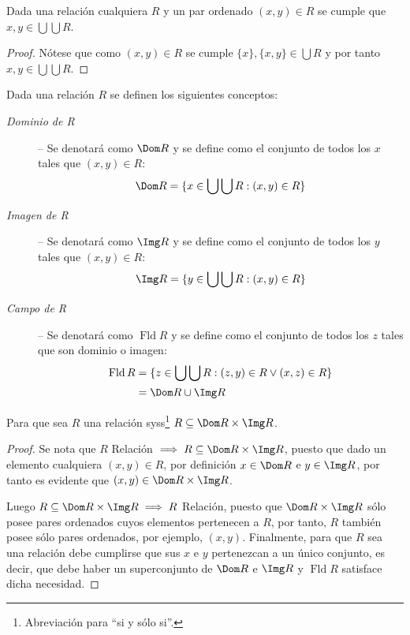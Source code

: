 \documentclass[11pt,oneside,a4paper]{book}
\DeclareMathOperator{\Fld}{Fld}
\begin{document}
\begin{lem}
Dada una relación cualquiera $R$ y un par ordenado $(x,y)\in R$ se cumple que $x,y\in \bigcup\bigcup R$.
\end{lem}
\begin{proof}
Nótese que como $(x,y)\in R$ se cumple $\{x\},\{x,y\}\in\bigcup R$ y por tanto $x,y\in\bigcup\bigcup R$.
\end{proof}
\begin{mydef}
Dada una relación $R$ se definen los siguientes conceptos:
\begin{description}
\item[\it Dominio de R] -- Se denotará como $\Dom R$ y se define como el conjunto de todos los $x$ tales que $(x,y)\in R$:
$$\Dom R=\{x\in\bigcup\bigcup R:(x,y)\in R\}$$
\item[\it Imagen de R] -- Se denotará como $\Img R$ y se define como el conjunto de todos los $y$ tales que $(x,y)\in R$:
$$\Img R=\{y\in\bigcup\bigcup R:(x,y)\in R\}$$
\item[\it Campo de R] -- Se denotará como $\Fld R$ y se define como el conjunto de todos los $z$ tales que son dominio o imagen:
\begin{align*}
\Fld R&=\{z\in\bigcup\bigcup R:(z,y)\in R\vee(x,z)\in R\}\\
&=\Dom R\cup\Img R
\end{align*}
\end{description}
\end{mydef}
\begin{prop}\label{prop:relation}
Para que sea $R$ una relación syss\footnote{Abreviación para ``si y sólo si''.} $R\subseteq\Dom R\times\Img R$.
\end{prop}
\begin{proof}
Se nota que $R$ Relación $\implies R\subseteq\Dom R\times\Img R$, puesto que dado un elemento cualquiera $(x,y)\in R$, por definición $x\in\Dom R$ e $y\in\Img R$, por tanto es evidente que $(x,y)\in\Dom R\times\Img R$.

Luego $R\subseteq\Dom R\times\Img R\implies R$ Relación, puesto que $\Dom R\times\Img R$ sólo posee pares ordenados cuyos elementos pertenecen a $R$, por tanto, $R$ también posee sólo pares ordenados, por ejemplo, $(x,y)$. Finalmente, para que $R$ sea una relación debe cumplirse que sus $x$ e $y$ pertenezcan a un único conjunto, es decir, que debe haber un superconjunto de $\Dom R$ e $\Img R$ y $\Fld R$ satisface dicha necesidad.
\end{proof}
\end{document}
